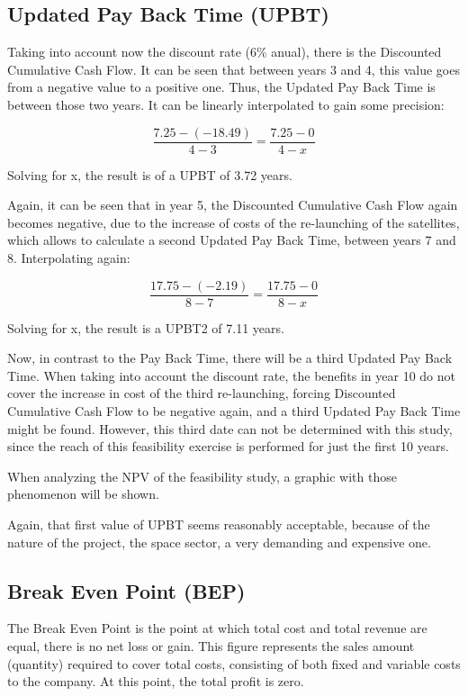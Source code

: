 \subsection{Updated Pay Back Time (UPBT)}
Taking into account now the discount rate (6\% anual), there is the Discounted Cumulative Cash Flow. It can be seen that between years 3 and 4, this value goes from a negative value to a positive one. Thus, the Updated Pay Back Time is between those two years. It can be linearly interpolated to gain some precision:

\begin{equation}
\frac{7.25-(-18.49)}{4-3}=\frac{7.25-0}{4-x}
\end{equation}

Solving for x, the result is of a UPBT of 3.72 years.

Again, it can be seen that in year 5, the Discounted Cumulative Cash Flow again becomes negative, due to the increase of costs of the re-launching of the satellites, which allows to calculate a second Updated Pay Back Time, between years 7 and 8. Interpolating again:

\begin{equation}
\frac{17.75-(-2.19)}{8-7}=\frac{17.75-0}{8-x}
\end{equation}


Solving for x, the result is a UPBT2 of 7.11 years. 

Now, in contrast to the Pay Back Time, there will be a third Updated Pay Back Time. When taking into account the discount rate, the benefits in year 10 do not cover the increase in cost of the third re-launching, forcing Discounted Cumulative Cash Flow to be negative again, and a third Updated Pay Back Time might be found. However, this third date can not be determined with this study, since the reach of this feasibility exercise is performed for just the first 10 years. 

When analyzing the NPV of the feasibility study, a graphic with those phenomenon will be shown. 

Again, that first value of UPBT seems reasonably acceptable, because of the nature of the project, the space sector, a very demanding and expensive one. 
\subsection{Break Even Point (BEP)}
The Break Even Point is the point at which total cost and total revenue are equal, there is no net loss or gain. This figure represents the sales amount (quantity) required to cover total costs, consisting of both fixed and variable costs to the company. At this point, the total profit is zero. 

